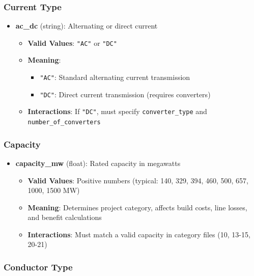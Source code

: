 \documentclass[ctcc_full_documentation.tex]{subfiles}
\begin{document}
\subsubsection{Current Type}

\begin{itemize}
    \item \textbf{ac\_dc} (string): Alternating or direct current
    \begin{itemize}
        \item \textbf{Valid Values}: \texttt{"AC"} or \texttt{"DC"}
        \item \textbf{Meaning}: 
        \begin{itemize}
            \item \texttt{"AC"}: Standard alternating current transmission
            \item \texttt{"DC"}: Direct current transmission (requires converters)
        \end{itemize}
        \item \textbf{Interactions}: If \texttt{"DC"}, must specify \texttt{converter\_type} and \texttt{number\_of\_converters}
    \end{itemize}
\end{itemize}

\subsubsection{Capacity}

\begin{itemize}
    \item \textbf{capacity\_mw} (float): Rated capacity in megawatts
    \begin{itemize}
        \item \textbf{Valid Values}: Positive numbers (typical: 140, 329, 394, 460, 500, 657, 1000, 1500 MW)
        \item \textbf{Meaning}: Determines project category, affects build costs, line losses, and benefit calculations
        \item \textbf{Interactions}: Must match a valid capacity in category files (10, 13-15, 20-21)
    \end{itemize}
\end{itemize}

\subsubsection{Conductor Type}
\end{document}
